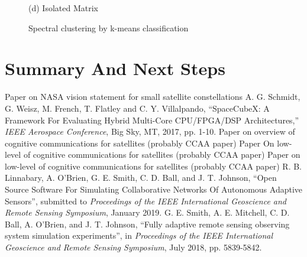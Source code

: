 \documentclass[conference]{IEEEtran}
\begin{document}
\begin{figure}[t!]
\begin{minipage}[b]{0.32\linewidth}
\begin{center}
      {\footnotesize(d) Isolated Matrix}
    \end{center}
  \end{minipage}
  \caption{Spectral clustering by k-means classification}
  \label{fig:clusters}
\end{figure}


\section{Summary And Next Steps}
\label{sec:summary}


\begin{thebibliography}{9}
{\small
{} Paper on NASA vision statement for small satellite constellations
 A. G. Schmidt, G. Weisz, M. French, T. Flatley and
C. Y. Villalpando, ``SpaceCubeX: A Framework For Evaluating Hybrid Multi-Core
CPU/FPGA/DSP Architectures,'' \textit{IEEE Aerospace Conference}, Big Sky,
MT, 2017, pp. 1-10.
 Paper on overview of cognitive communications for satellites
  (probably CCAA paper)
 Paper On low-level of cognitive communications for satellites
  (probably CCAA paper)
 Paper on low-level of cognitive communications for satellites
  (probably CCAA paper)
 R. B. Linnabary, A. O'Brien, G. E. Smith, C. D. Ball, and
  J. T. Johnson, ``Open Source Software For Simulating Collaborative Networks Of
  Autonomous Adaptive Sensors'', submitted to {\it Proceedings of the IEEE
    International Geoscience and Remote Sensing Symposium}, January 2019.
 G. E. Smith, A. E. Mitchell, C. D. Ball, A. O'Brien, and
  J. T. Johnson, ``Fully adaptive remote sensing observing system simulation
  experiments'', in {\it Proceedings of the IEEE International Geoscience and
    Remote Sensing Symposium}, July 2018, pp. 5839-5842.
}
\end{thebibliography}
\end{document}
